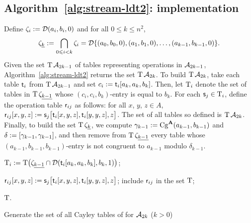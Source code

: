   \subsection{Algorithm~\ref{alg:stream-ldt2}: implementation}
  Define $\zeta_i := \mathcal{D} (a_i, b_i, 0)$ and for all $0\leq k \leq n^2$,
  \[
    \zeta_{\underline{k}} := \bigcap_{0\leqslant i < k}\zeta_i
      =\mathcal{D} \{(a_0, b_0, 0), (a_1, b_1, 0), \dots, (a_{k-1}, b_{k-1}, 0) \}.
  \]
  Given the set $\operatorname{T} \mathcal{A}_{2k-1}$ of tables representing operations in
  $\mathcal{A}_{2k-1}$, Algorithm~\ref{alg:stream-ldt2} 
  returns the set $\operatorname{T} \mathcal{A}_{2k}$.
  To build $\operatorname{T} \mathcal{A}_{2k}$, take each table $\mathsf{t}_i$ from $\operatorname{T} \mathcal{A}_{2k-1}$
  and set $c_i:= \mathsf{t}_i[a_k, a_k, b_k]$. Then, let $\operatorname{T}_i$ denote 
  the set of tables in $\operatorname{T} \zeta_{\underline{k-1}}$ whose 
  $(c_i, c_i, b_k)$-entry is equal to $b_k$. 
  For each $\mathsf{s}_j \in \operatorname{T}_i$, define the operation table 
  $\mathsf{r}_{ij}$ as follows:
  for all $x$, $y$, $z \in A$, 
  $\mathsf{r}_{ij}[x,y,z] :=  \mathsf{s}_{j}\bigl[\mathsf{t}_i[x,y,z], \mathsf{t}_i[y,y,z], z\bigr]$. 
  The set of all tables so defined is $\operatorname{T} \mathcal{A}_{2k}$.
  Finally, to build the set $\operatorname{T} \zeta_{\underline{k}}$, we 
  compute $\gamma_{k-1} := \operatorname{Cg}^{\mathbf{A}}(a_{k-1}, b_{k-1})$ and $\delta := [\gamma_{k-1}, \gamma_{k-1}]$,
  and then remove from $\operatorname{T} \zeta_{\underline{k-1}}$ every table whose 
  $(a_{k-1},b_{k-1},b_{k-1})$-entry is not congruent to $a_{k-1}$ modulo $\delta_{k-1}$.
  
  
  
  \begin{algorithm}
    
     {
      
      $\operatorname{T}_i := \operatorname{T} \bigl( \zeta_{\underline{k-1}}  \cap \mathcal{D} (\mathsf{t}_i[a_k, a_k, b_k], b_k, 1)\bigr)$;
    
       {
          {
          $\mathsf{r}_{ij}[x,y,z] :=  \mathsf{s}_{j}\bigl[\mathsf{t}_i[x,y,z], \mathsf{t}_i[y,y,z], z\bigr]$;
        }
        include $\mathsf{r}_{ij}$ in the set $\operatorname{T}$;
      }
    }
    
    
    \Return $\operatorname{T}$.
    
    \caption{Generate the set of all Cayley tables of \ldtos for $\mathcal{A}_{2k}$ \label{alg:stream-ldt2} {\small ($k> 0$)}}
  \end{algorithm}
    
